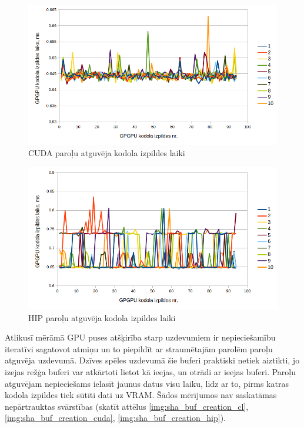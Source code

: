 \begin{figure}[H] \centering
    \includegraphics[width=\textwidth]{images/sha_kernel_exec_cuda.png}
    \caption{CUDA paroļu atguvēja kodola izpildes laiki}
    \label{img:sha_exec_cuda}
\end{figure}

\begin{figure}[H] \centering
    \includegraphics[width=\textwidth]{images/sha_kernel_exec_hip.png}
    \caption{HIP paroļu atguvēja kodola izpildes laiki}
    \label{img:sha_exec_hip}
\end{figure}


Atlikusī mērāmā GPU puses atšķirība starp uzdevumiem ir nepieciešamību
iteratīvi sagatovot atmiņu un to piepildīt ar straumētajām parolēm paroļu
atguvēja uzdevumā. Dzīves spēles uzdevumā šie buferi praktiski netiek aiztikti,
jo izejas režģa buferi var atkārtoti lietot kā ieejas, un otrādi ar ieejas
buferi. Paroļu atguvējam nepieciešams ielasīt jaunus datus visu laiku, līdz ar
to, pirms katras kodola izpildes tiek sūtīti dati uz VRAM.
Šādos mērījumos nav saskatāmas nepārtrauktas svārstības (skatīt attēlus
\ref{img:sha_buf_creation_cl}, \ref{img:sha_buf_creation_cuda},
\ref{img:sha_buf_creation_hip}).


